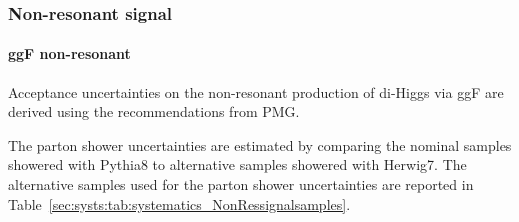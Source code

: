 

\subsubsection{Non-resonant signal}

\paragraph{ggF non-resonant}

Acceptance uncertainties on the non-resonant production of di-Higgs via ggF are derived using the recommendations from PMG.

The parton shower uncertainties are estimated by comparing the nominal samples showered with Pythia8 to alternative samples showered with Herwig7. The alternative samples used for the parton shower uncertainties are reported in Table~\ref{sec:systs:tab:systematics_NonRessignalsamples}.


